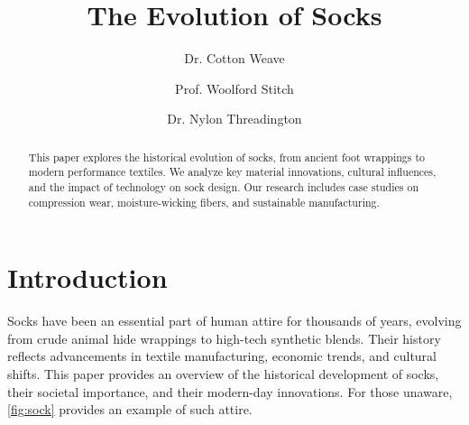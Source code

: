 \documentclass[runningheads]{llncs}
\begin{document}
\title{
    The Evolution of Socks
}

\author{Dr. Cotton Weave \and
Prof. Woolford Stitch \and
Dr. Nylon Threadington
}




\maketitle

\begin{abstract}
This paper explores the historical evolution of socks, from ancient foot wrappings to modern performance textiles. 
We analyze key material innovations, cultural influences, and the impact of technology on sock design.
Our research includes case studies on compression wear, moisture-wicking fibers, and sustainable manufacturing.


\end{abstract}

\section{Introduction}\label{sec:Introduction}



Socks have been an essential part of human attire for thousands of years, evolving from crude animal hide wrappings to high-tech synthetic blends. Their history reflects advancements in textile manufacturing, economic trends, and cultural shifts. This paper provides an overview of the historical development of socks, their societal importance, and their modern-day innovations. For those unaware, \autoref{fig:sock} provides an example of such attire.
\end{document}
